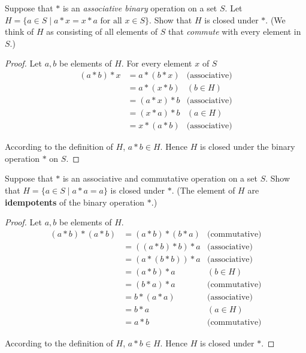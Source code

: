 \begin{exercise}
    Suppose that $*$ is an \textit{associative binary} operation on a set $S$. Let $H = \{ a \in S \mid a * x = x * a \text{ for all } x\in S \}$. Show that $H$ is closed under $*$. (We think of $H$ as consisting of all elements of $S$ that \textit{commute} with every element in $S$.)
\end{exercise}

\begin{proof}
    Let $a, b$ be elements of $H$. For every element $x$ of $S$
    \begin{align*}
        (a * b) * x & = a * (b * x) & \text{(associative)} \\
                    & = a * (x * b) & (b\in H)             \\
                    & = (a * x) * b & \text{(associative)} \\
                    & = (x * a) * b & (a\in H)             \\
                    & = x * (a * b) & \text{(associative)}
    \end{align*}

    According to the definition of $H$, $a * b\in H$. Hence $H$ is closed under the binary operation $*$ on $S$.
\end{proof}

\begin{exercise}
    Suppose that $*$ is an associative and commutative operation on a set $S$. Show that $H = \{ a\in S \mid a * a = a \}$ is closed under $*$. (The element of $H$ are \textbf{idempotents} of the binary operation $*$.)
\end{exercise}

\begin{proof}
    Let $a, b$ be elements of $H$.
    \begin{align*}
        (a * b) * (a * b) & = (a * b) * (b * a) & \text{(commutative)} \\
                          & = ((a * b) * b) * a & \text{(associative)} \\
                          & = (a * (b * b)) * a & \text{(associative)} \\
                          & = (a * b) * a       & (b\in H)             \\
                          & = (b * a) * a       & \text{(commutative)} \\
                          & = b * (a * a)       & \text{(associative)} \\
                          & = b * a             & (a\in H)             \\
                          & = a * b             & \text{(commutative)}
    \end{align*}

    According to the definition of $H$, $a * b\in H$. Hence $H$ is closed under $*$.
\end{proof}

